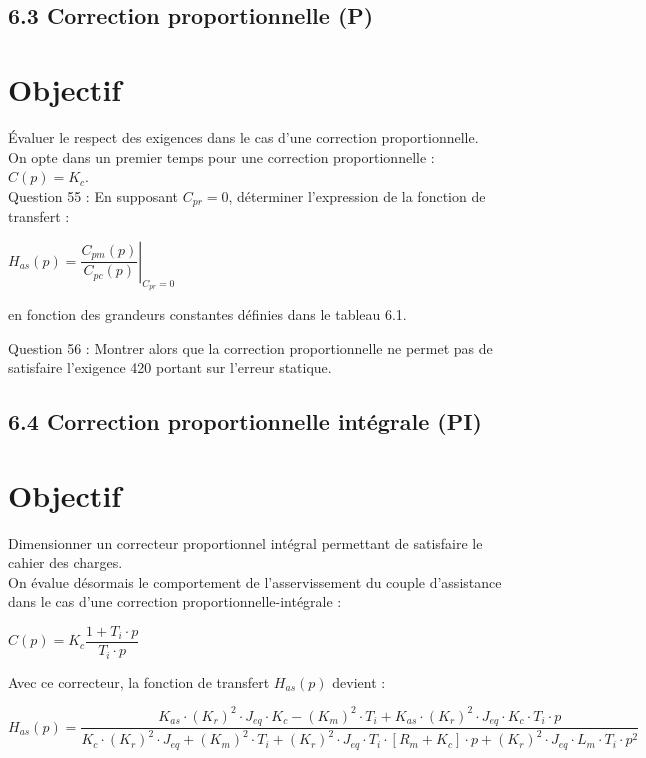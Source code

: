 \else
\fi

\subsection{6.3 Correction proportionnelle (P)}
\section{Objectif}
Évaluer le respect des exigences dans le cas d'une correction proportionnelle.\\
On opte dans un premier temps pour une correction proportionnelle : \(C(p)=K_{c}\).\\
Question 55 : En supposant \(C_{p r}=0\), déterminer l'expression de la fonction de transfert :

$
H_{a s}(p)=\left.\dfrac{C_{p m}(p)}{C_{p c}(p)}\right|_{C_{p r}=0}
$

en fonction des grandeurs constantes définies dans le tableau 6.1.

Question 56 : Montrer alors que la correction proportionnelle ne permet pas de satisfaire l'exigence 420 portant sur l'erreur statique.

\subsection{6.4 Correction proportionnelle intégrale (PI)}
\section{Objectif}
Dimensionner un correcteur proportionnel intégral permettant de satisfaire le cahier des charges.\\
On évalue désormais le comportement de l'asservissement du couple d'assistance dans le cas d'une correction proportionnelle-intégrale :

$
C(p)=K_{c} \dfrac{1+T_{i} \cdot p}{T_{i} \cdot p}
$

Avec ce correcteur, la fonction de transfert \(H_{a s}(p)\) devient :

$
H_{a s}(p)=\dfrac{K_{a s} \cdot\left(K_{r}\right)^{2} \cdot J_{e q} \cdot K_{c}-\left(K_{m}\right)^{2} \cdot T_{i}+K_{a s} \cdot\left(K_{r}\right)^{2} \cdot J_{e q} \cdot K_{c} \cdot T_{i} \cdot p}{K_{c} \cdot\left(K_{r}\right)^{2} \cdot J_{e q}+\left(K_{m}\right)^{2} \cdot T_{i}+\left(K_{r}\right)^{2} \cdot J_{e q} \cdot T_{i} \cdot\left[R_{m}+K_{c}\right] \cdot p+\left(K_{r}\right)^{2} \cdot J_{e q} \cdot L_{m} \cdot T_{i} \cdot p^{2}}
$

